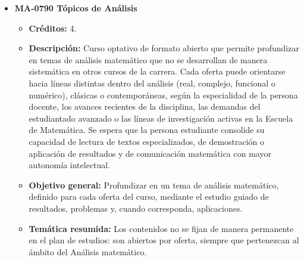 \begin{itemize}[leftmargin=1.3em, itemsep=10pt, topsep=4pt, label={\color{Azul-UCR}$\blacksquare$}]
\item {\color{Azul-UCR}\textbf{MA-0790 Tópicos de Análisis}}\par\nopagebreak\smallskip
\begin{itemize}[leftmargin=1.1em, itemsep=3pt, topsep=2pt, parsep=2pt, label={\textendash}]
\item \textbf{Créditos:} 4.
\item \textbf{Descripción:} Curso optativo de formato abierto que permite profundizar en temas de análisis matemático que no se desarrollan de manera sistemática en otros cursos de la carrera. Cada oferta puede orientarse hacia líneas distintas dentro del análisis (real, complejo, funcional o numérico), clásicas o contemporáneas, según la especialidad de la persona docente, los avances recientes de la disciplina, las demandas del estudiantado avanzado o las líneas de investigación activas en la Escuela de Matemática. Se espera que la persona estudiante consolide su capacidad de lectura de textos especializados, de demostración o aplicación de resultados y de comunicación matemática con mayor autonomía intelectual.
\item \textbf{Objetivo general:} Profundizar en un tema de análisis matemático, definido para cada oferta del curso, mediante el estudio guiado de resultados, problemas y, cuando corresponda, aplicaciones.
\item \textbf{Temática resumida:} Los contenidos no se fijan de manera permanente en el plan de estudios: son abiertos por oferta, siempre que pertenezcan al ámbito del Análisis matemático.
\end{itemize}


\end{itemize}

